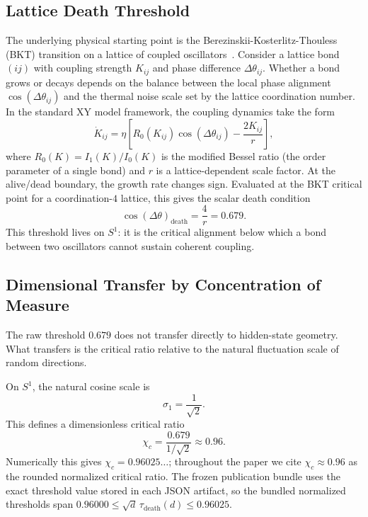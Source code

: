 \documentclass[aps,prd,onecolumn,superscriptaddress,showpacs,12pt]{revtex4-2}
\newcommand{\taudeath}{\tau_{\mathrm{death}}}
\newcommand{\chic}{\chi_c}
\newcommand{\Rzero}{R_0}
\begin{document}
\subsection{Lattice Death Threshold}

The underlying physical starting point is the
Berezinskii-Kosterlitz-Thouless (BKT) transition on a lattice of coupled
oscillators~\cite{Kosterlitz1973,Kuramoto1984}. Consider a lattice bond $(ij)$
with coupling strength $K_{ij}$ and phase difference $\Delta \theta_{ij}$.
Whether a bond grows or decays depends on the balance between the local phase
alignment $\cos(\Delta \theta_{ij})$ and the thermal noise scale set by the
lattice coordination number. In the standard XY model framework, the coupling
dynamics take the form
\begin{equation}
\dot{K}_{ij} = \eta \left[\Rzero(K_{ij}) \cos(\Delta \theta_{ij}) - \frac{2K_{ij}}{r}\right],
\end{equation}
where $\Rzero(K)=I_1(K)/I_0(K)$ is the modified Bessel ratio (the order
parameter of a single bond) and $r$ is a lattice-dependent scale factor. At the
alive/dead boundary, the growth rate changes sign. Evaluated at the BKT critical
point for a coordination-$4$ lattice, this gives the scalar death condition
\begin{equation}
\cos(\Delta \theta)_{\mathrm{death}} = \frac{4}{r} = 0.679.
\end{equation}
This threshold lives on $S^1$: it is the critical alignment below which a bond
between two oscillators cannot sustain coherent coupling.

\subsection{Dimensional Transfer by Concentration of Measure}

The raw threshold $0.679$ does not transfer directly to hidden-state geometry. What
transfers is the critical ratio relative to the natural fluctuation scale of random
directions.

On $S^1$, the natural cosine scale is
\begin{equation}
\sigma_1=\frac{1}{\sqrt{2}}.
\end{equation}
This defines a dimensionless critical ratio
\begin{equation}
\chic=\frac{0.679}{1/\sqrt{2}} \approx 0.96.
\end{equation}
Numerically this gives $\chic = 0.96025\ldots$; throughout the paper we cite
$\chic \approx 0.96$ as the rounded normalized critical ratio. The frozen
publication bundle uses the exact threshold value stored in each JSON artifact, so
the bundled normalized thresholds span $0.96000 \le \sqrt{d}\,\taudeath(d) \le 0.96025$.
\end{document}
